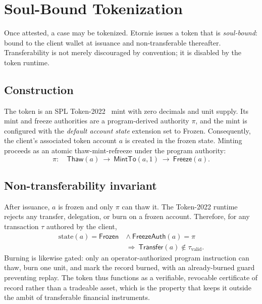\documentclass[conference]{IEEEtran}
\begin{document}
\section{Soul-Bound Tokenization}
\label{sec:token}

Once attested, a case may be tokenized. Etornie issues a token that is
\emph{soul-bound}: bound to the client wallet at issuance and
non-transferable thereafter. Transferability is not merely discouraged by
convention; it is disabled by the token runtime.

\subsection{Construction}

The token is an SPL Token-2022~\cite{token2022} mint with zero decimals and
unit supply. Its
mint and freeze authorities are a program-derived authority $\pi$, and the
mint is configured with the \emph{default account state} extension set to
\textsf{Frozen}. Consequently, the client's associated token account $a$ is
created in the frozen state. Minting proceeds as an atomic
thaw-mint-refreeze under the program authority:
\begin{equation}
\pi:\quad \mathsf{Thaw}(a)\ \to\ \mathsf{MintTo}(a, 1)\ \to\
\mathsf{Freeze}(a).
\end{equation}

\subsection{Non-transferability invariant}

After issuance, $a$ is frozen and only $\pi$ can thaw it. The Token-2022
runtime rejects any transfer, delegation, or burn on a frozen account.
Therefore, for any transaction $\tau$ authored by the client,
\begin{equation}
\begin{aligned}
\mathrm{state}(a) = \textsf{Frozen} \ &\wedge\ \mathsf{FreezeAuth}(a) = \pi \\
&\Rightarrow\ \mathsf{Transfer}(a) \notin \tau_{\mathrm{valid}}.
\end{aligned}
\end{equation}
Burning is likewise gated: only an operator-authorized program instruction
can thaw, burn one unit, and mark the record burned, with an
already-burned guard preventing replay. The token thus functions as a
verifiable, revocable certificate of record rather than a tradeable asset,
which is the property that keeps it outside the ambit of transferable
financial instruments.
\end{document}
